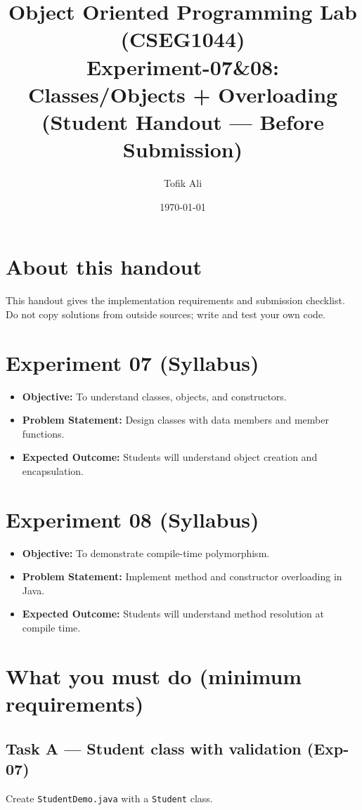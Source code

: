 \documentclass[11pt]{article}
\title{Object Oriented Programming Lab (CSEG1044)\\Experiment-07\&08: Classes/Objects + Overloading (Student Handout --- Before Submission)}
\author{Tofik Ali}
\date{\today}
\begin{document}
\maketitle
\tableofcontents

\section{About this handout}
This handout gives the implementation requirements and submission checklist.
Do not copy solutions from outside sources; write and test your own code.

\section{Experiment 07 (Syllabus)}
\begin{itemize}[leftmargin=*]
  \item \textbf{Objective:} To understand classes, objects, and constructors.
  \item \textbf{Problem Statement:} Design classes with data members and member functions.
  \item \textbf{Expected Outcome:} Students will understand object creation and encapsulation.
\end{itemize}

\section{Experiment 08 (Syllabus)}
\begin{itemize}[leftmargin=*]
  \item \textbf{Objective:} To demonstrate compile-time polymorphism.
  \item \textbf{Problem Statement:} Implement method and constructor overloading in Java.
  \item \textbf{Expected Outcome:} Students will understand method resolution at compile time.
\end{itemize}

\section{What you must do (minimum requirements)}

\subsection{Task A --- Student class with validation (Exp-07)}
Create \texttt{StudentDemo.java} with a \texttt{Student} class.
\end{document}
